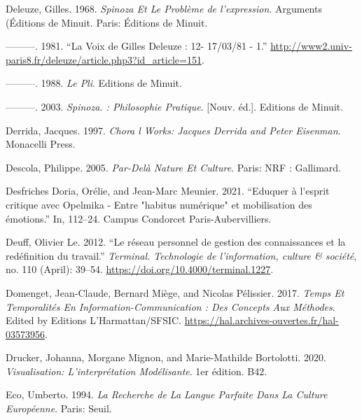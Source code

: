 \documentclass[
  letterpaper,
  DIV=11,
  numbers=noendperiod]{scrreprt}
\newlength{\cslhangindent}
\newlength{\cslentryspacingunit} %
\newenvironment{CSLReferences}[2] %
 {%
  \setlength{\parindent}{0pt}
  \ifodd #1
  \let\oldpar\par
  \def\par{\hangindent=\cslhangindent\oldpar}
  \fi
  \setlength{\parskip}{#2\cslentryspacingunit}
 }%
 {}
\begin{document}
\begin{CSLReferences}{1}{0}
\leavevmode{}%
Deleuze, Gilles. 1968. \emph{Spinoza Et Le Problème de l'expression}.
Arguments (Éditions de Minuit. Paris: Éditions de Minuit.

\leavevmode{}%
---------. 1981. {``La Voix de Gilles Deleuze : 12- 17/03/81 - 1.''}
\url{http://www2.univ-paris8.fr/deleuze/article.php3?id_article=151}.

\leavevmode{}%
---------. 1988. \emph{Le Pli}. Editions de Minuit.

\leavevmode{}%
---------. 2003. \emph{Spinoza. : Philosophie Pratique}. {[}Nouv.
éd.{]}. Editions de Minuit.

\leavevmode{}%
Derrida, Jacques. 1997. \emph{Chora l Works: Jacques Derrida and Peter
Eisenman}. Monacelli Press.

\leavevmode{}%
Descola, Philippe. 2005. \emph{Par-Delà Nature Et Culture}. Paris: NRF :
Gallimard.

\leavevmode{}%
Desfriches Doria, Orélie, and Jean-Marc Meunier. 2021. {``Eduquer à
l'esprit critique avec Opelmika - Entre {"}habitus numérique{"} et
mobilisation des émotions.''} In, 112--24. Campus Condorcet
Paris-Aubervilliers.

\leavevmode{}%
Deuff, Olivier Le. 2012. {``Le réseau personnel de gestion des
connaissances et la redéfinition du travail.''} \emph{Terminal.
Technologie de l'information, culture \& société}, no. 110 (April):
39--54. \url{https://doi.org/10.4000/terminal.1227}.

\leavevmode{}%
Domenget, Jean-Claude, Bernard Miège, and Nicolas Pélissier. 2017.
\emph{Temps Et Temporalités En Information-Communication : Des Concepts
Aux Méthodes}. Edited by Editions L'Harmattan/SFSIC.
\url{https://hal.archives-ouvertes.fr/hal-03573956}.

\leavevmode{}%
Drucker, Johanna, Morgane Mignon, and Marie-Mathilde Bortolotti. 2020.
\emph{Visualisation: L'interprétation Modélisante}. 1er édition. B42.

\leavevmode{}%
Eco, Umberto. 1994. \emph{La Recherche de La Langue Parfaite Dans La
Culture Européenne}. Paris: Seuil.


\end{CSLReferences}
\end{document}
